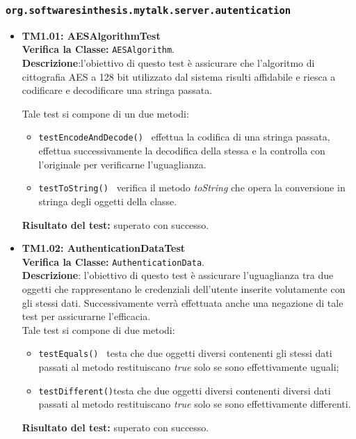 \subsubsection{\texttt{org.softwaresinthesis.mytalk.server.autentication}}
\begin{itemize}
\item \textbf{TM1.01: AESAlgorithmTest}\\
\textbf{Verifica la Classe:} \texttt{AESAlgorithm}.\\
\textbf{Descrizione}:l'obiettivo di questo test è assicurare che l'algoritmo di cittografia AES a 128 bit utilizzato dal sistema \caName{} risulti affidabile e riesca a codificare e decodificare una stringa passata.

Tale test si compone di un due metodi:
\begin{itemize}
\item \texttt{testEncodeAndDecode() } effettua la codifica di una stringa passata, effettua successivamente la decodifica della stessa e la controlla con l'originale per verificarne l'uguaglianza.
\item \texttt{testToString() } verifica il metodo \textit{toString} che opera la conversione in stringa degli oggetti della classe.
\end{itemize}
\textbf{Risultato del test:} superato con successo.

\begin{table}
\end{table}

\item \textbf{TM1.02: AuthenticationDataTest}\\
\textbf{Verifica la Classe:} \texttt{AuthenticationData}.\\
\textbf{Descrizione}: l'obiettivo di questo test è assicurare l'uguaglianza tra due oggetti che rappresentano le credenziali dell'utente inserite volutamente con gli stessi dati. Successivamente verrà effettuata anche una negazione di tale test per assicurarne l'efficacia.\\
Tale test si compone di due metodi:
\begin{itemize}
\item \texttt{testEquals() } testa che due oggetti diversi contenenti gli stessi dati passati al metodo restituiscano \textit{true} solo se sono effettivamente uguali;
\item \texttt{testDifferent()}testa che due oggetti diversi contenenti diversi dati passati al metodo restituiscano \textit{true} solo se sono effettivamente differenti.
\end{itemize}
\textbf{Risultato del test:} superato con successo.


\end{itemize}
